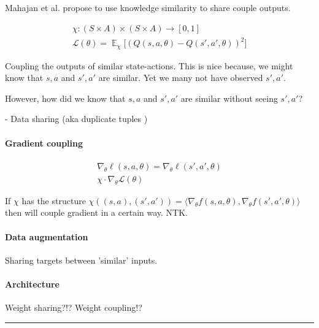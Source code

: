 Mahajan et al. propose to use knowledge similarity to share couple outputs.
\cite{Mahajan2017}

\begin{align*}
\chi: (S\times A) \times (S\times A) \to [0, 1] \\
\mathcal L(\theta) = \mathop{\mathbb E}_{\chi} \Big[(Q(s, a, \theta)-Q(s', a', \theta))^2 \Big]
\end{align*}

Coupling the outputs of similar state-actions. This is nice because, we might know
that $s, a$ and $s', a'$ are similar. Yet we many not have observed $s', a'$.


However, how did we know that $s, a$ and $s', a'$ are similar without seeing $s', a'$?

- Data sharing (aka duplicate tuples \cite{Ho2019a})

\paragraph{Gradient coupling}

\begin{align*}
\nabla_{\theta} \ell(s, a, \theta) = \nabla_{\theta} \ell(s', a', \theta) \\
\chi \cdot \nabla_{\theta} \mathcal L(\theta)
\end{align*}

If $\chi$ has the structure $\chi((s, a), (s', a')) = \langle \nabla_{\theta}f(s, a, \theta), \nabla_{\theta} f(s', a', \theta) \rangle$ then will couple gradient in a certain way. NTK.

\cite{Ho2019a}

\paragraph{Data augmentation}

Sharing targets between 'similar' inputs.

\paragraph{Architecture}

Weight sharing?!? Weight coupling!?
\cite{Ravanbakhsh2017a,Abdolhosseini}
\cite{Anselmi2019}

\begin{center}\rule{0.5\linewidth}{\linethickness}\end{center}


